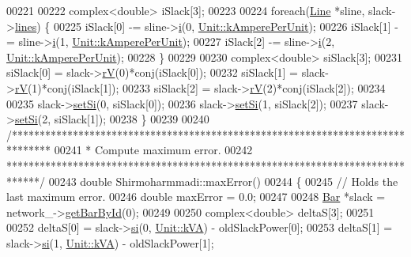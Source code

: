\begin{DoxyCode}
00221 
00222   complex<double> iSlack[3];
00223 
00224   \textcolor{keywordflow}{foreach}(\hyperlink{class_line}{Line} *sline, slack->\hyperlink{class_bar_a5aabf1f4ac22e20e9cb702a3a7e08eea}{lines}) \{
00225     iSlack[0] -= sline->\hyperlink{group___models_ga2ad899adaa4f2e25b38c58e076db94ea}{i}(0, \hyperlink{class_unit_a0794cf6c9682f48296dd4a5315389787aeed3b50e464d581cb630181a3b6a0709}{Unit::kAmperePerUnit});
00226     iSlack[1] -= sline->\hyperlink{group___models_ga2ad899adaa4f2e25b38c58e076db94ea}{i}(1, \hyperlink{class_unit_a0794cf6c9682f48296dd4a5315389787aeed3b50e464d581cb630181a3b6a0709}{Unit::kAmperePerUnit});
00227     iSlack[2] -= sline->\hyperlink{group___models_ga2ad899adaa4f2e25b38c58e076db94ea}{i}(2, \hyperlink{class_unit_a0794cf6c9682f48296dd4a5315389787aeed3b50e464d581cb630181a3b6a0709}{Unit::kAmperePerUnit});
00228   \}
00229 
00230   complex<double> siSlack[3];
00231   siSlack[0] = slack->\hyperlink{group___models_ga6c83eb997f5038e0b9bbd5472582e0a8}{rV}(0)*conj(iSlack[0]);
00232   siSlack[1] = slack->\hyperlink{group___models_ga6c83eb997f5038e0b9bbd5472582e0a8}{rV}(1)*conj(iSlack[1]);
00233   siSlack[2] = slack->\hyperlink{group___models_ga6c83eb997f5038e0b9bbd5472582e0a8}{rV}(2)*conj(iSlack[2]);
00234 
00235   slack->\hyperlink{group___models_ga85e2a9b8a281900333fd65d1b532acfd}{setSi}(0, siSlack[0]);
00236   slack->\hyperlink{group___models_ga85e2a9b8a281900333fd65d1b532acfd}{setSi}(1, siSlack[2]);
00237   slack->\hyperlink{group___models_ga85e2a9b8a281900333fd65d1b532acfd}{setSi}(2, siSlack[1]);
00238 \}
00239 
00240 \textcolor{comment}{/*******************************************************************************}
00241 \textcolor{comment}{ * Compute maximum error.}
00242 \textcolor{comment}{ ******************************************************************************/}
00243 \textcolor{keywordtype}{double} Shirmoharmmadi::maxError()
00244 \{
00245   \textcolor{comment}{// Holds the last maximum error.}
00246   \textcolor{keywordtype}{double} maxError = 0.0;
00247 
00248   \hyperlink{class_bar}{Bar} *slack = network\_->\hyperlink{group___models_ga04d524ce0fa0dd0d06deda92b1597af0}{getBarById}(0);
00249 
00250   complex<double> deltaS[3];
00251 
00252   deltaS[0] = slack->\hyperlink{group___models_ga9af07eb85c2c76eb3bc73e25bb842c1e}{si}(0, \hyperlink{class_unit_ace265ae255370ccacfd5370337572c3ba72b181a842ae2759488a2fa1410d3696}{Unit::kVA}) - oldSlackPower[0];
00253   deltaS[1] = slack->\hyperlink{group___models_ga9af07eb85c2c76eb3bc73e25bb842c1e}{si}(1, \hyperlink{class_unit_ace265ae255370ccacfd5370337572c3ba72b181a842ae2759488a2fa1410d3696}{Unit::kVA}) - oldSlackPower[1];

\end{DoxyCode}
